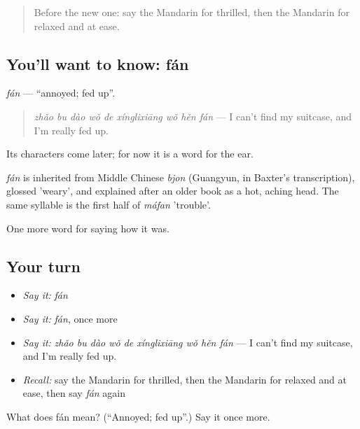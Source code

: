 \label{lesson:ZH-C458-fan}



\begin{quote}
Before the new one: say the Mandarin for thrilled, then the Mandarin for relaxed and at ease.
\end{quote}

\subsection*{You'll want to know: fán}
\emph{fán} — \textquotedblleft{}annoyed; fed up\textquotedblright{}.

\begin{quote}
\emph{zhǎo bu dào wǒ de xínglixiāng wǒ hěn fán} — I can't find my suitcase, and I'm really fed up.
\end{quote}

Its characters come later; for now it is a word for the ear.

\begin{cousinweb}
\emph{fán} is inherited from Middle Chinese \emph{bjon} (Guangyun, in Baxter's transcription), glossed 'weary', and explained after an older book as a hot, aching head. The same syllable is the first half of \emph{máfan} 'trouble'.
\end{cousinweb}

\begin{grammarlens}[title={What you've built}]
One more word for saying how it was.
\end{grammarlens}

\subsection*{Your turn}
\begin{itemize}
\raggedright
  \item \emph{Say it:} \emph{fán}
  \item \emph{Say it:} \emph{fán}, once more
  \item \emph{Say it:} \emph{zhǎo bu dào wǒ de xínglixiāng wǒ hěn fán} — I can't find my suitcase, and I'm really fed up.
  \item \emph{Recall:} say the Mandarin for thrilled, then the Mandarin for relaxed and at ease, then say \emph{fán} again
\end{itemize}

\begin{tcolorbox}[breakable,colback=teal!4,colframe=teal!35!black,title={Before you move on}]
What does fán mean? (\textquotedblleft{}Annoyed; fed up\textquotedblright{}.) Say it once more.
\end{tcolorbox}
